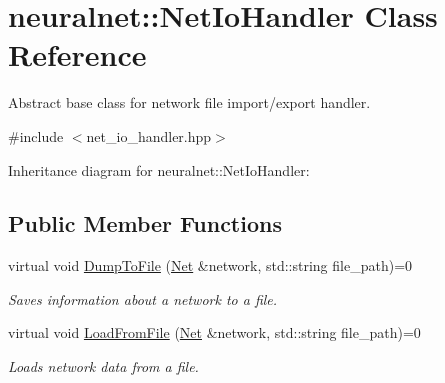 \hypertarget{classneuralnet_1_1NetIoHandler}{}\section{neuralnet\+:\+:Net\+Io\+Handler Class Reference}
\label{classneuralnet_1_1NetIoHandler}


Abstract base class for network file import/export handler.  




{\ttfamily \#include $<$net\+\_\+io\+\_\+handler.\+hpp$>$}



Inheritance diagram for neuralnet\+:\+:Net\+Io\+Handler\+:
\subsection*{Public Member Functions}
\begin{DoxyCompactItemize}
\item 
virtual void \hyperlink{classneuralnet_1_1NetIoHandler_a580e3b0768346da97ad40464cb62fe5c}{Dump\+To\+File} (\hyperlink{classneuralnet_1_1Net}{Net} \&network, std\+::string file\+\_\+path)=0
\begin{DoxyCompactList}\small\item\em Saves information about a network to a file. \end{DoxyCompactList}\item 
virtual void \hyperlink{classneuralnet_1_1NetIoHandler_a9c6c5be1288e314c2affac7c939c52b5}{Load\+From\+File} (\hyperlink{classneuralnet_1_1Net}{Net} \&network, std\+::string file\+\_\+path)=0
\begin{DoxyCompactList}\small\item\em Loads network data from a file. \end{DoxyCompactList}\end{DoxyCompactItemize}

